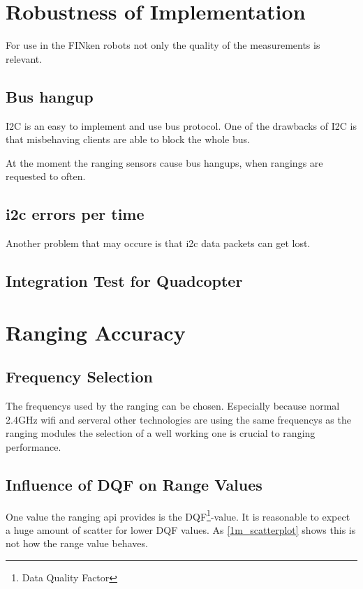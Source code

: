 
\section{Robustness of Implementation}

For use in the FINken robots not only the quality of the measurements is relevant.


\subsection{Bus hangup}
I2C is an easy to implement and use bus protocol.
One of the drawbacks of I2C is that misbehaving clients are able to block the whole bus.

At the moment the ranging sensors cause bus hangups, when rangings are requested to often.

\subsection{i2c errors per time}
Another problem that may occure is that i2c data packets can get lost.

\subsection{Integration Test for Quadcopter}


\section{Ranging Accuracy}

\subsection{Frequency Selection}
The frequencys used by the ranging can be chosen.
Especially because normal 2.4GHz wifi and serveral other technologies are using the same frequencys as the ranging modules the selection of a well working one is crucial to ranging performance.


\subsection{Influence of DQF on Range Values}
One value the ranging api provides is the DQF\footnote{Data Quality Factor}-value.
It is reasonable to expect a huge amount of scatter for lower DQF values.
As \autoref{1m_scatterplot} shows this is not how the range value behaves.

